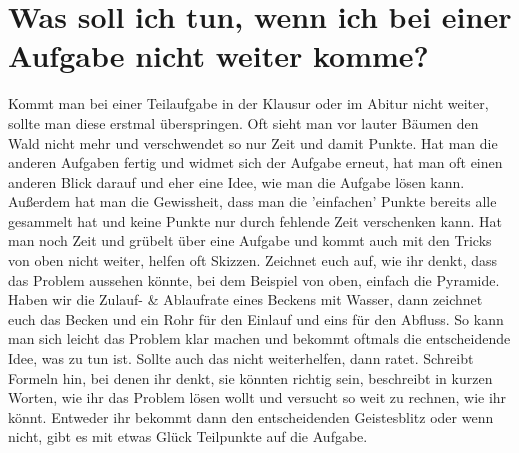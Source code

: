 	
	\section{Was soll ich tun, wenn ich bei einer Aufgabe nicht weiter komme?}
		Kommt man bei einer Teilaufgabe in der Klausur oder im Abitur nicht weiter,
		sollte man diese erstmal überspringen. Oft sieht man vor lauter Bäumen den
		Wald nicht mehr und verschwendet so nur Zeit und damit Punkte. Hat man die
		anderen Aufgaben fertig und widmet sich der Aufgabe erneut, hat man oft einen
		anderen Blick darauf und eher eine Idee, wie man die Aufgabe lösen kann.
		Außerdem hat man die Gewissheit, dass man die 'einfachen' Punkte bereits
		alle gesammelt hat und keine Punkte nur durch fehlende Zeit verschenken
		kann.
		Hat man noch Zeit und grübelt über eine Aufgabe und kommt auch mit den Tricks
		von oben nicht weiter, helfen oft Skizzen. Zeichnet euch auf, wie ihr denkt,
		dass das Problem aussehen könnte, bei dem Beispiel von oben, einfach die
		Pyramide. Haben wir die Zulauf- \& Ablaufrate eines Beckens mit Wasser, dann
		zeichnet euch das Becken und ein Rohr für den Einlauf und eins für den Abfluss. 
		So kann man sich leicht das Problem klar machen und bekommt oftmals die
		entscheidende Idee, was zu tun ist.
		Sollte auch das nicht weiterhelfen, dann ratet. Schreibt Formeln hin, bei
		denen ihr denkt, sie könnten richtig sein, beschreibt in kurzen Worten, wie
		ihr das Problem lösen wollt und versucht so weit zu rechnen, wie ihr könnt.
		Entweder ihr bekommt dann den entscheidenden Geistesblitz oder wenn nicht,
		gibt es mit etwas Glück Teilpunkte auf die Aufgabe.
